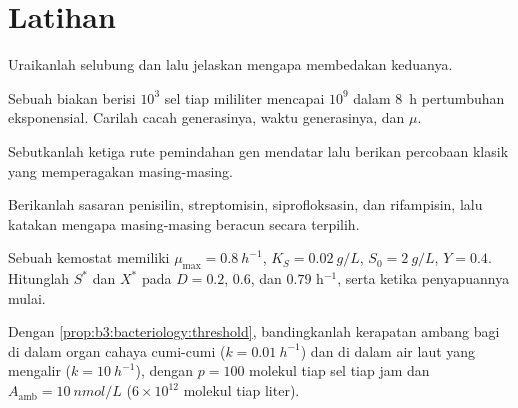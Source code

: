 \section{Latihan}

\begin{exercise}[$\star$]\label{exo:b3:bacteriology:1}
Uraikanlah selubung  dan  lalu jelaskan mengapa
 membedakan keduanya.
\end{exercise}

\begin{exercise}[$\star$]\label{exo:b3:bacteriology:2}
Sebuah biakan berisi $10^{3}$ sel tiap mililiter mencapai $10^{9}$ dalam
\qty{8}{h} pertumbuhan eksponensial. Carilah cacah generasinya, waktu
generasinya, dan $\mu$.
\end{exercise}

\begin{exercise}[$\star$]\label{exo:b3:bacteriology:3}
Sebutkanlah ketiga rute pemindahan gen mendatar lalu berikan percobaan klasik
yang memperagakan masing-masing.
\end{exercise}

\begin{exercise}[$\star$]\label{exo:b3:bacteriology:4}
Berikanlah sasaran penisilin, streptomisin, siprofloksasin, dan
rifampisin, lalu katakan mengapa masing-masing beracun secara terpilih.
\end{exercise}

\begin{exercise}[$\star\star$]\label{exo:b3:bacteriology:5}
Sebuah kemostat memiliki $\mu_{\max} = \qty{0.8}{h^{-1}}$, $K_{S} =
\qty{0.02}{g/L}$, $S_{0} = \qty{2}{g/L}$, $Y = 0.4$. Hitunglah $S^{*}$ dan
$X^{*}$ pada $D = 0.2$, $0.6$, dan $0.79$ h$^{-1}$, serta 
ketika penyapuannya mulai.
\end{exercise}

\begin{exercise}[$\star\star$]\label{exo:b3:bacteriology:6}
Dengan \cref{prop:b3:bacteriology:threshold}, bandingkanlah kerapatan ambang
bagi  di dalam organ cahaya cumi-cumi ($k =
\qty{0.01}{h^{-1}}$) dan di dalam air laut yang mengalir ($k = \qty{10}{h^{-1}}$),
dengan $p = 100$ molekul tiap sel tiap jam dan $A_{\text{amb}} =
\qty{10}{nmol/L}$ ($6\times 10^{12}$ molekul tiap liter).
\end{exercise}

